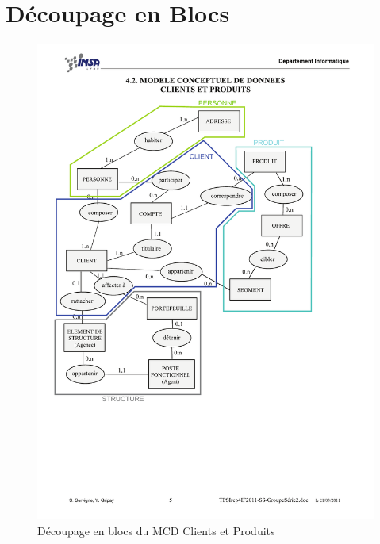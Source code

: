 \section{Découpage en Blocs}
\begin{figure}[H]
	\begin{center}
		\includegraphics[scale=0.8,clip, trim = 5mm 65mm 35mm 35mm]{Includes/SOA-Blocs-1.pdf}
		\caption{Découpage en blocs du MCD Clients et Produits}
	\end{center}
\end{figure}

